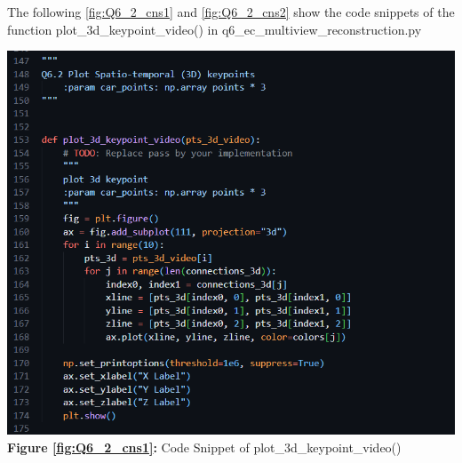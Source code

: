 \begin{your_solution}[title=Q6.2 continued,height=12.5cm,width=\linewidth]
	The following \autoref{fig:Q6_2_cns1} and \autoref{fig:Q6_2_cns2} show the code snippets of the function plot\_3d\_keypoint\_video() in q6\_ec\_multiview\_reconstruction.py
\newline

\begin{minipage}[b]{0.5\textwidth}
	\centering
	\includegraphics[width=\textwidth]{../Q6_2_cns1.png}
	\textbf{Figure \ref{fig:Q6_2_cns1}:} Code Snippet of plot\_3d\_keypoint\_video()
	\label{fig:Q6_2_cns1}         %
\end{minipage}
\begin{minipage}[b]{0.5\textwidth}
	\centering

\end{minipage}
\end{your_solution}
